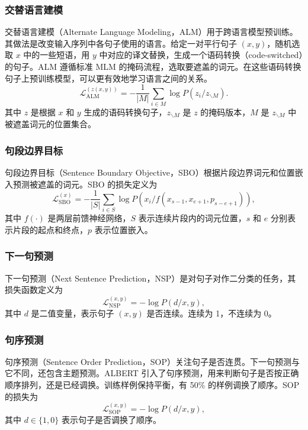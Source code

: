 \subsubsection{交替语言建模}
交替语言建模（Alternate Language Modeling，ALM）用于跨语言模型预训练。其做法是改变输入序列中各句子使用的语言。给定一对平行句子 $(x,y)$，随机选取 $x$ 中的一些短语，用 $y$ 中对应的译文替换，生成一个语码转换（code-switched）的句子。ALM 遵循标准 MLM 的掩码流程，选取要遮盖的词元。在这些语码转换句子上预训练模型，可以更有效地学习语言之间的关系。
\begin{equation}
\mathcal{L}_{\mathrm{ALM}}^{(z(x,y))}
=-\frac{1}{|M|}\sum_{i\in M}\log P(z_i/z_{\backslash M}).
\tag{2.28}
\end{equation}
其中 $z$ 是根据 $x$ 和 $y$ 生成的语码转换句子，$z_{\backslash M}$ 是 $z$ 的掩码版本，$M$ 是 $z_{\backslash M}$ 中被遮盖词元的位置集合。

\subsubsection{句段边界目标}
句段边界目标（Sentence Boundary Objective，SBO）根据片段边界词元和位置嵌入预测被遮盖的词元。SBO 的损失定义为
\begin{equation}
\mathcal{L}_{\mathrm{SBO}}^{(x)}
=-\frac{1}{|S|}\sum_{i\in S}\log P(x_i/f(x_{s-1},x_{e+1},p_{s-e+1})),
\tag{2.29}
\end{equation}
其中 $f(\cdot)$ 是两层前馈神经网络，$S$ 表示连续片段内的词元位置，$s$ 和 $e$ 分别表示片段的起点和终点，$p$ 表示位置嵌入。

\subsubsection{下一句预测}
下一句预测（Next Sentence Prediction，NSP）是对句子对作二分类的任务，其损失函数定义为
\begin{equation}
\mathcal{L}_{\mathrm{NSP}}^{(x,y)}=-\log P(d/x,y),
\tag{2.30}
\end{equation}
其中 $d$ 是二值变量，表示句子 $(x,y)$ 是否连续。连续为 1，不连续为 0。

\subsubsection{句序预测}
句序预测（Sentence Order Prediction，SOP）关注句子是否连贯。下一句预测与它不同，还包含主题预测。ALBERT 引入了句序预测，用来判断句子是否按正确顺序排列，还是已经调换。训练样例保持平衡，有 50\% 的样例调换了顺序。SOP 的损失为
\begin{equation}
\mathcal{L}_{\mathrm{SOP}}^{(x,y)}=-\log P(d/x,y),
\tag{2.31}
\end{equation}
其中 $d\in\{1,0\}$ 表示句子是否调换了顺序。

